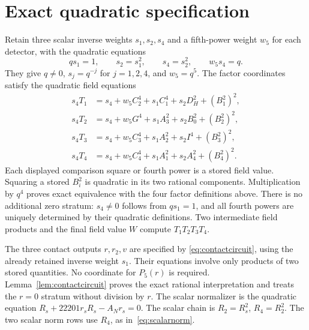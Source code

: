 \documentclass[11pt,a4paper]{article}
\begin{document}
\section{Exact quadratic specification}
Retain three scalar inverse weights $s_1,s_2,s_4$ and a fifth-power
weight $w_5$ for each detector, with the quadratic equations
\begin{equation}\label{eq:inverseweights}
 qs_1=1,\qquad s_2=s_1^2,\qquad s_4=s_2^2,\qquad w_5s_4=q.
\end{equation}
They give $q\ne0$, $s_j=q^{-j}$ for $j=1,2,4$, and $w_5=q^5$.
The factor coordinates satisfy the quadratic field equations
\begin{equation}\label{eq:clearedfactors}
\begin{split}
 s_4T_1&=s_4+w_5C_2^4+s_1C_1^4+s_2D_H^2+(B_1^2)^2,\\
 s_4T_2&=s_4+w_5G^4+s_1A_3^2+s_2B_0^2+(B_2^2)^2,\\
 s_4T_3&=s_4+w_5C_3^4+s_1A_2^2+s_2I^4+(B_3^2)^2,\\
 s_4T_4&=s_4+w_5C_4^4+s_1A_1^2+s_2A_4^2+(B_4^2)^2.
\end{split}
\end{equation}
Each displayed comparison square or fourth power is a stored field
value. Squaring a stored $B_i^2$ is quadratic in its two rational
components. Multiplication by $q^4$ proves exact equivalence with
the four factor definitions above. There is no additional zero stratum:
$s_4\ne0$ follows from $qs_1=1$, and all fourth powers are
uniquely determined by their quadratic definitions.
Two intermediate field products and the final field value $W$
compute $T_1T_2T_3T_4$.

The three contact outputs $r,r_2,v$ are specified by
\eqref{eq:contactcircuit}, using the already retained inverse weight
$s_1$. Their equations involve only products of two stored quantities.
No coordinate for $P_5(r)$ is required. Lemma~\ref{lem:contactcircuit}
proves the exact rational interpretation and treats the $r=0$ stratum
without division by $r$.
The scalar normalizer is the quadratic equation
$R_s+22201r_sR_s-A_Nr_s=0$.
The scalar chain is $R_2=R_s^2$, $R_4=R_2^2$.
The two scalar norm rows use $R_4$, as in~\eqref{eq:scalarnorm}.
\end{document}
